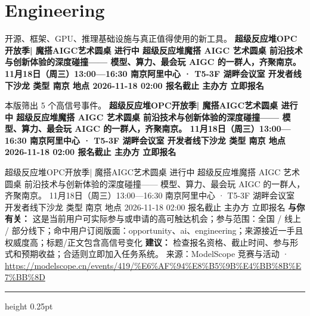 \documentclass[10.5pt]{ctexart}
\begin{document}
\section*{Engineering}
{\color{ormuted} 开源、框架、GPU、推理基础设施与真正值得使用的新工具。}
\vspace{2mm}
{\LARGE\bfseries 超级反应堆OPC开放季| 魔搭AIGC艺术圆桌 进行中 超级反应堆魔搭 AIGC 艺术圆桌 前沿技术与创新体验的深度碰撞—— 模型、算力、最会玩 AIGC 的一群人，齐聚南京。 11月18日（周三）13:00—16:30 南京阿里中心 · T5-3F 湖畔会议室 开发者线下沙龙 类型 南京 地点 2026-11-18 02:00 报名截止 主办方 立即报名}\par
\vspace{1mm}
{\color{ormuted} 本版筛出 5 个高信号事件。}
\vspace{3mm}
{\Large\bfseries 超级反应堆OPC开放季| 魔搭AIGC艺术圆桌 进行中 超级反应堆魔搭 AIGC 艺术圆桌 前沿技术与创新体验的深度碰撞—— 模型、算力、最会玩 AIGC 的一群人，齐聚南京。 11月18日（周三）13:00—16:30 南京阿里中心 · T5-3F 湖畔会议室 开发者线下沙龙 类型 南京 地点 2026-11-18 02:00 报名截止 主办方 立即报名}\par
超级反应堆OPC开放季| 魔搭AIGC艺术圆桌 进行中 超级反应堆魔搭 AIGC 艺术圆桌 前沿技术与创新体验的深度碰撞—— 模型、算力、最会玩 AIGC 的一群人，齐聚南京。 11月18日（周三）13:00—16:30 南京阿里中心 · T5-3F 湖畔会议室 开发者线下沙龙 类型 南京 地点 2026-11-18 02:00 报名截止 主办方 立即报名
\textbf{与你有关：} 这是当前用户可实际参与或申请的高可触达机会；参与范围：全国 / 线上 / 部分线下；命中用户订阅版面：opportunity、ai、engineering；来源接近一手且权威度高；标题/正文包含高信号变化
\textbf{建议：} 检查报名资格、截止时间、参与形式和预期收益；合适则立即加入任务系统。
{\footnotesize\color{ormuted} 来源：ModelScope 竞赛与活动 · \url{https://modelscope.cn/events/419/%E6%AF%94%E8%B5%9B%E4%BB%8B%E7%BB%8D}}
\vspace{4mm}
\hrule height 0.25pt
\vspace{3mm}
\end{document}
